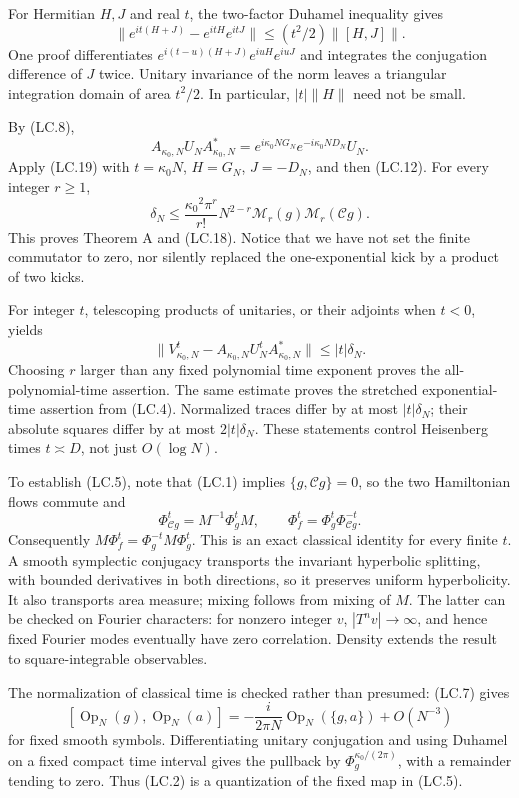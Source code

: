 For Hermitian \(H,J\) and real \(t\), the two-factor Duhamel inequality gives \[
 \|e^{it(H+J)}-e^{itH}e^{itJ}\|\leq(t^2/2)\|[H,J]\|.        \tag{LC.19}
\] One proof differentiates \(e^{i(t-u)(H+J)}e^{iuH}e^{iuJ}\) and integrates the conjugation difference of \(J\) twice. Unitary invariance of the norm leaves a triangular integration domain of area \(t^2/2\). In particular, \(|t|\|H\|\) need not be small.

By (LC.8), \[
 A_{{\kappa_0},N}U_NA_{{\kappa_0},N}^*
       =e^{i{\kappa_0} NG_N}e^{-i{\kappa_0} ND_N}U_N.
\] Apply (LC.19) with \(t={\kappa_0} N\), \(H=G_N\), \(J=-D_N\), and then (LC.12). For every integer \(r\geq1\), \[
 \boxed{\displaystyle
 \delta_N\leq\frac{{\kappa_0}^2\pi^r}{r!}N^{2-r}
                   \mathcal M_r(g)\mathcal M_r(\mathcal Cg).} \tag{LC.20}
\] This proves Theorem A and (LC.18). Notice that we have not set the finite commutator to zero, nor silently replaced the one-exponential kick by a product of two kicks.

For integer \(t\), telescoping products of unitaries, or their adjoints when \(t<0\), yields \[
 \|V_{{\kappa_0},N}^t-A_{{\kappa_0},N}U_N^tA_{{\kappa_0},N}^*\|
       \leq |t|\delta_N.                                   \tag{LC.21}
\] Choosing \(r\) larger than any fixed polynomial time exponent proves the all-polynomial-time assertion. The same estimate proves the stretched exponential-time assertion from (LC.4). Normalized traces differ by at most \(|t|\delta_N\); their absolute squares differ by at most \(2|t|\delta_N\). These statements control Heisenberg times \(t\asymp D\), not just \(O(\log N)\).

To establish (LC.5), note that (LC.1) implies \(\{g,\mathcal Cg\}=0\), so the two Hamiltonian flows commute and \[
 \Phi_{\mathcal Cg}^t=M^{-1}\Phi_g^tM,\qquad
 \Phi_f^t=\Phi_g^t\Phi_{\mathcal Cg}^{-t}.
\] Consequently \(M\Phi_f^t=\Phi_g^{-t}M\Phi_g^t\). This is an exact classical identity for every finite \(t\). A smooth symplectic conjugacy transports the invariant hyperbolic splitting, with bounded derivatives in both directions, so it preserves uniform hyperbolicity. It also transports area measure; mixing follows from mixing of \(M\). The latter can be checked on Fourier characters: for nonzero integer \(v\), \(|T^nv|\to\infty\), and hence fixed Fourier modes eventually have zero correlation. Density extends the result to square-integrable observables.

The normalization of classical time is checked rather than presumed: (LC.7) gives \[
 [\operatorname{Op}_N(g),\operatorname{Op}_N(a)]
 =-\frac{i}{2\pi N}\operatorname{Op}_N(\{g,a\})+O(N^{-3})
\] for fixed smooth symbols. Differentiating unitary conjugation and using Duhamel on a fixed compact time interval gives the pullback by \(\Phi_g^{{\kappa_0}/(2\pi)}\), with a remainder tending to zero. Thus (LC.2) is a quantization of the fixed map in (LC.5).

